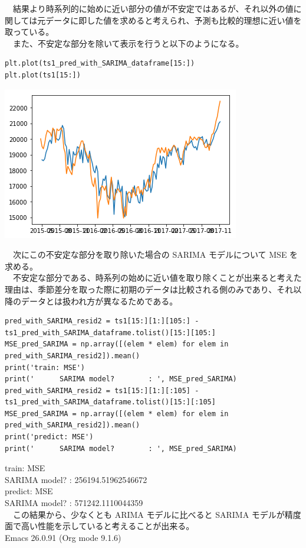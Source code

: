 \documentclass{scrartcl}
\begin{document}
　結果より時系列的に始めに近い部分の値が不安定ではあるが、それ以外の値に関しては元データに即した値を求めると考えられ、予測も比較的理想に近い値を取っている。\\
　また、不安定な部分を除いて表示を行うと以下のようになる。\\
\begin{verbatim}
plt.plot(ts1_pred_with_SARIMA_dataframe[15:])
plt.plot(ts1[15:])
\end{verbatim}

\begin{center}
\includegraphics[width=.9\linewidth]{./obipy-resources/fFVOJA.png}
\end{center}

　次にこの不安定な部分を取り除いた場合の SARIMA モデルについて MSE を求める。\\
　不安定な部分である、時系列の始めに近い値を取り除くことが出来ると考えた理由は、季節差分を取った際に初期のデータは比較される側のみであり、それ以降のデータとは扱われ方が異なるためである。\\

\begin{verbatim}
pred_with_SARIMA_resid2 = ts1[15:][1:][105:] - ts1_pred_with_SARIMA_dataframe.tolist()[15:][105:]
MSE_pred_SARIMA = np.array([(elem * elem) for elem in pred_with_SARIMA_resid2]).mean()
print('train: MSE')
print('      SARIMA model?        : ', MSE_pred_SARIMA)
pred_with_SARIMA_resid2 = ts1[15:][1:][:105] - ts1_pred_with_SARIMA_dataframe.tolist()[15:][:105]
MSE_pred_SARIMA = np.array([(elem * elem) for elem in pred_with_SARIMA_resid2]).mean()
print('predict: MSE')
print('      SARIMA model?        : ', MSE_pred_SARIMA)
\end{verbatim}

train: MSE\\
      SARIMA model?        :  256194.51962546672\\
predict: MSE\\
      SARIMA model?        :  571242.1110044359\\

　この結果から、少なくとも ARIMA モデルに比べると SARIMA モデルが精度面で高い性能を示していると考えることが出来る。\\
\printbibliography
Emacs 26.0.91 (Org mode 9.1.6)
\end{document}
